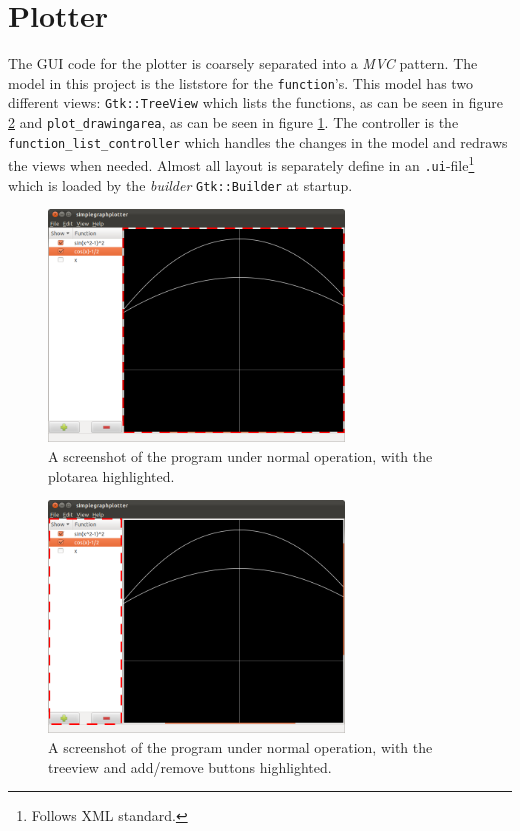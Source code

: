 \documentclass[a4paper,11pt]{kth-mag}
\begin{document}
\section{Plotter}
The GUI code for the plotter is coarsely separated into a \emph{MVC} pattern. 
The model in this project is the liststore for the \texttt{function}'s. This model 
has two different views: \texttt{Gtk::TreeView} which lists the functions, as can be seen
in figure \ref{fig:screenshotfunctionlistcontroller} and
\texttt{plot\_drawingarea}, as can be seen in figure
\ref{fig:screenshotplotarea}.
The controller is the \texttt{function\_list\_controller} which handles the
changes in the model and redraws the views when needed.
Almost all layout is separately define in an \texttt{.ui}-file\footnote{Follows XML
standard.} which is loaded by the \emph{builder} \texttt{Gtk::Builder} at startup.

\begin{figure}[H]
\begin{center}
    \includegraphics[width=0.7\textwidth]{screenshot00_plotarea.png}
    \caption{\small{A screenshot of the program under normal operation, with
    the plotarea highlighted.}}
   \label{fig:screenshotplotarea}
\end{center}
\end{figure}
\begin{figure}[H]
\begin{center}
    \includegraphics[width=0.7\textwidth]{screenshot00_function_list_controller.png}
    \caption{\small{A screenshot of the program under normal operation, with
    the treeview and add/remove buttons highlighted.}}
   \label{fig:screenshotfunctionlistcontroller}
\end{center}
\end{figure}
\end{document}
